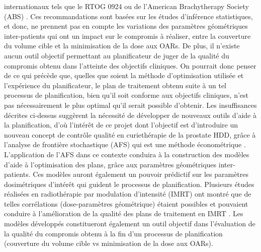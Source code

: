 internationaux tels que le RTOG 0924 \cite{ RTOG}   ou de l’American Brachytherapy Society (ABS) \cite{ABS}. Ces recommandations sont basées sur les études d’inférence statistiques, et donc, ne prennent pas en compte les variations des paramètres géométriques inter-patients qui ont un impact sur le compromis à réaliser, entre la couverture du volume cible et la minimisation de la dose aux OARs. De plus, il n’existe aucun outil objectif permettant au planificateur de juger de la qualité du compromis obtenu dans l’atteinte des objectifs cliniques. On pourrait donc penser de ce qui précède que, quelles que soient la méthode d’optimisation utilisée et l’expérience du planificateur, le plan de traitement obtenu suite à un tel processus de planification, bien qu’il soit conforme aux objectifs cliniques, n’est pas nécessairement le plus optimal qu’il serait possible d’obtenir. Les insuffisances décrites ci-dessus suggèrent la nécessité de développer de nouveaux outils d’aide à la planification, d’où l’intérêt de ce projet dont l’objectif est d’introduire un nouveau concept de contrôle qualité en curiethérapie de la prostate HDD, grâce à l’analyse de frontière stochastique (AFS)  qui est une méthode économétrique \cite{Dennis}. L’application de l’AFS dans ce contexte conduira à la construction des modèles d’aide à l’optimisation des plans, grâce aux paramètres géométriques inter-patients. Ces modèles auront également un pouvoir prédictif sur les paramètres dosimétriques d’intérêt qui guident le processus de planification. Plusieurs études réalisées en radiothérapie par modulation d’intensité (IMRT)  ont montré que de telles corrélations (dose-paramètres géométrique) étaient possibles et pouvaient conduire à l’amélioration de la qualité des plans de traitement en IMRT \cite{LachanceB, KevinLM, MargieAH, Marie-Chantal}. Les modèles développés constitueront également un outil objectif dans l’évaluation de la qualité du compromis obtenu à la fin d’un processus de planification (couverture du volume cible vs minimisation de la dose aux OARs).
%
